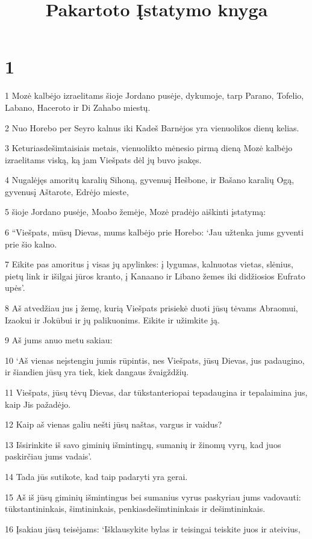 

\title{Pakartoto Įstatymo knyga}

\chapter{1}


\par 1 Mozė kalbėjo izraelitams šioje Jordano pusėje, dykumoje, tarp Parano, Tofelio, Labano, Haceroto ir Di Zahabo miestų. 
\par 2 Nuo Horebo per Seyro kalnus iki Kadeš Barnėjos yra vienuolikos dienų kelias. 
\par 3 Keturiasdešimtaisiais metais, vienuolikto mėnesio pirmą dieną Mozė kalbėjo izraelitams viską, ką jam Viešpats dėl jų buvo įsakęs. 
\par 4 Nugalėjęs amoritų karalių Sihoną, gyvenusį Hešbone, ir Bašano karalių Ogą, gyvenusį Aštarote, Edrėjo mieste, 
\par 5 šioje Jordano pusėje, Moabo žemėje, Mozė pradėjo aiškinti įstatymą: 
\par 6 “Viešpats, mūsų Dievas, mums kalbėjo prie Horebo: ‘Jau užtenka jums gyventi prie šio kalno. 
\par 7 Eikite pas amoritus į visas jų apylinkes: į lygumas, kalnuotas vietas, slėnius, pietų link ir išilgai jūros kranto, į Kanaano ir Libano žemes iki didžiosios Eufrato upės’. 
\par 8 Aš atvedžiau jus į žemę, kurią Viešpats prisiekė duoti jūsų tėvams Abraomui, Izaokui ir Jokūbui ir jų palikuonims. Eikite ir užimkite ją. 
\par 9 Aš jums anuo metu sakiau: 
\par 10 ‘Aš vienas neįstengiu jumis rūpintis, nes Viešpats, jūsų Dievas, jus padaugino, ir šiandien jūsų yra tiek, kiek dangaus žvaigždžių. 
\par 11 Viešpats, jūsų tėvų Dievas, dar tūkstanteriopai tepadaugina ir tepalaimina jus, kaip Jis pažadėjo. 
\par 12 Kaip aš vienas galiu nešti jūsų naštas, vargus ir vaidus? 
\par 13 Išsirinkite iš savo giminių išmintingų, sumanių ir žinomų vyrų, kad juos paskirčiau jums vadais’. 
\par 14 Tada jūs sutikote, kad taip padaryti yra gerai. 
\par 15 Aš iš jūsų giminių išmintingus bei sumanius vyrus paskyriau jums vadovauti: tūkstantininkais, šimtininkais, penkiasdešimtininkais ir dešimtininkais. 
\par 16 Įsakiau jūsų teisėjams: ‘Išklausykite bylas ir teisingai teiskite juos ir ateivius, 
